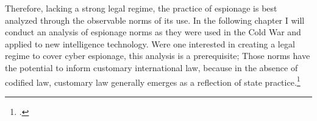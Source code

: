 \documentclass[11pt]{memoir}
\begin{document}
\begin{refsegment}
Therefore, lacking a strong legal regime, the practice of espionage is best analyzed through the observable norms of its use. In the following chapter I will conduct an analysis of espionage norms as they were used in the Cold War and applied to new intelligence technology. Were one interested in creating a legal regime to cover cyber espionage, this analysis is a prerequisite; Those norms have the potential to inform customary international law, because in the absence of codified law, customary law generally emerges as a reflection of state practice.\footcite[p.~628]{sulmasy_counterintuitive_2007}


\newpage
\printbibliography[heading=subbibliography]

\end{refsegment}
\end{document}
